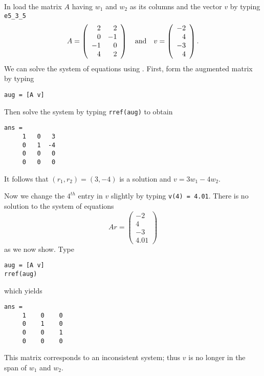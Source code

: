 \documentclass{ximera}
\begin{document}
In \Matlab load the matrix $A$ having $w_1$ and
$w_2$ as its columns and the vector $v$ by typing {\tt e5\_3\_5}
\begin{equation*}  \label{e:Aandv}
A=\left(\begin{array}{rr} 2 & 2 \\ 0 & -1 \\ -1 & 0 \\ 4 & 2
\end{array}\right) \quad\mbox{and}\quad
v=\left(\begin{array}{r} -2 \\ 4 \\ -3 \\ 4 \end{array}\right).
\end{equation*}%
We can solve the system of equations using \Matlabp.
First, form the augmented matrix by typing
\begin{verbatim}
aug = [A v]
\end{verbatim}
Then solve the system by typing {\tt rref(aug)} to obtain
\begin{verbatim}
ans =
     1   0   3
     0   1  -4
     0   0   0
     0   0   0
\end{verbatim}
It follows that $(r_1,r_2)=(3,-4)$ is a solution and $v=3w_1-4w_2$.

Now we change the $4^{th}$ entry in $v$ slightly by typing
{\tt v(4) = 4.01}.  There is no solution to the system of equations
\[
Ar = \left(\begin{array}{r} -2 \\ 4 \\ -3 \\ 4.01
\end{array}\right)
\]
as we now show.  Type
\begin{verbatim}
aug = [A v]
rref(aug)
\end{verbatim}
which yields
\begin{verbatim}
ans =
     1    0    0
     0    1    0
     0    0    1
     0    0    0
\end{verbatim}
This matrix corresponds to an inconsistent system;
thus $v$ is no longer in the span of $w_1$ and $w_2$.

\EXER

\CEXER
\end{document}
